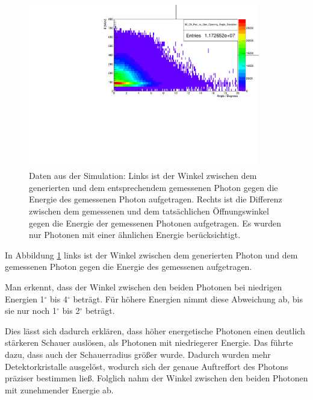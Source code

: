 \documentclass[a4paper,11pt,oneside,final,german,openbib,pdftex]{scrbook}
\begin{document}
{\begin{figure}[h!]
\begin{minipage}{0.45\textwidth}
	\end{minipage}
	\hfill
	\begin{minipage}{0.45\textwidth}
		\centering
		\includegraphics[width=0.9\textwidth]{NewCalib/20171904SimOpeningAngleDeviation}
	\end{minipage}
	\caption[Simulation:Symmetrische Photonen Winkel zw. Gen. und Rec. Photonen unterschied zwischen Gen. und Rec. \"Offnungswinkel]{Daten aus der Simulation: Links ist der Winkel zwischen dem generierten und dem entsprechendem gemessenen Photon gegen die Energie des gemessenen Photon aufgetragen. Rechts ist die Differenz zwischen dem gemessenen und dem tats\"achlichen \"Offnungswinkel gegen die Energie der gemessenen Photonen aufgetragen. Es wurden nur Photonen mit einer \"ahnlichen Energie ber\"ucksichtigt.}
	\label{fig:Abweichung-Winkel-Oeffnungswinkel}

\end{figure}


In Abbildung \ref{fig:Abweichung-Winkel-Oeffnungswinkel} links ist der Winkel zwischen dem generierten Photon und dem gemessenen Photon gegen die Energie des gemessenen aufgetragen.  

Man erkennt, dass der Winkel zwischen den beiden Photonen bei niedrigen Energien 1$^{\circ}$ bis 4$^{\circ}$ betr\"agt. F\"ur h\"ohere Energien nimmt diese Abweichung ab, bis sie nur noch 1$^{\circ}$ bis 2$^{\circ}$ betr\"agt.

Dies l\"asst sich dadurch erkl\"aren, dass h\"oher energetische Photonen einen deutlich st\"arkeren Schauer ausl\"osen, als Photonen mit niedriegerer Energie. Das f\"uhrte dazu, dass auch der Schauerradius gr\"o{\ss}er wurde. Dadurch wurden mehr Detektorkristalle ausgel\"ost, wodurch sich der genaue Auftreffort des Photons pr\"aziser bestimmen lie{\ss}. Folglich nahm der Winkel zwischen den beiden Photonen mit zunehmender Energie ab.

}
\end{document}
